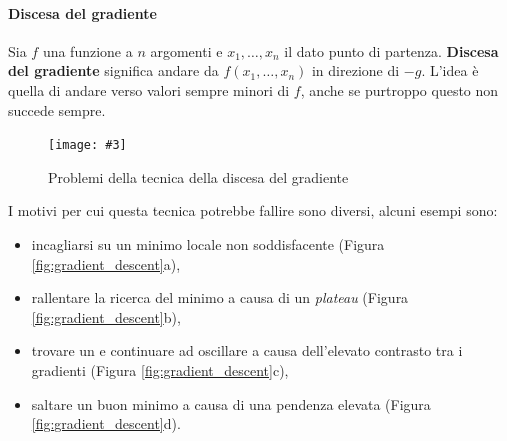 \documentclass[12pt, twoside, letterpaper]{report}
\newcommand{\img}[4] {
	\begin{figure}
		\centering
		\texttt{[image: \#3]}\\
		\caption{#1}
		\label{fig:#4}
	\end{figure}
}
\begin{document}
				\paragraph{Discesa del gradiente} Sia $f$ una funzione a $n$ argomenti e $x_1, \dots, x_n$ il dato punto di partenza. \textbf{Discesa del gradiente} significa andare da $f(x_1, \dots, x_n)$ in direzione di $-g$. L'idea è quella di andare verso valori sempre minori di $f$, anche se purtroppo questo non succede sempre.
				\img{Problemi della tecnica della discesa del gradiente \cite{kriesel}}{0.4}{gradient_descent.png}{gradient_descent_problemi}
				I motivi per cui questa tecnica potrebbe fallire sono diversi, alcuni esempi sono: 
				\begin{itemize}
				 	\item incagliarsi su un minimo locale non soddisfacente (Figura \ref{fig:gradient_descent}a),
				 	\item rallentare la ricerca del minimo a causa di un \textit{plateau} (Figura \ref{fig:gradient_descent}b),
				 	\item trovare un  e continuare ad oscillare a causa dell'elevato contrasto tra i gradienti (Figura \ref{fig:gradient_descent}c),
				 	\item saltare un buon minimo a causa di una pendenza elevata (Figura \ref{fig:gradient_descent}d).
				 \end{itemize} 
				 
				 

\end{document}
